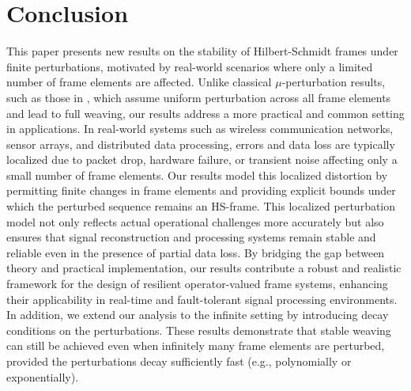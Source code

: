 \documentclass[reqno]{amsart}
\theoremstyle{plain}
\theoremstyle{remark}
\numberwithin{equation}{section}
\begin{document}
\section{Conclusion}

This paper presents new results on the stability of Hilbert-Schmidt frames under finite perturbations, motivated by real-world scenarios where only a limited number of frame elements are affected. Unlike classical $\mu$-perturbation results, such as those in \cite{CGK}, which assume uniform perturbation across all frame elements and lead to full weaving, our results address a more practical and common setting in applications. In real-world systems such as wireless communication networks, sensor arrays, and distributed data processing, errors and data loss are typically localized due to packet drop, hardware failure, or transient noise affecting only a small number of frame elements. Our results model this localized distortion by permitting finite changes in frame elements and providing explicit bounds under which the perturbed sequence remains an HS-frame. This localized perturbation model not only reflects actual operational challenges more accurately but also ensures that signal reconstruction and processing systems remain stable and reliable even in the presence of partial data loss.
By bridging the gap between theory and practical implementation, our results contribute a robust and realistic framework for the design of resilient operator-valued frame systems, enhancing their applicability in real-time and fault-tolerant signal processing environments. In addition, we extend our analysis to the infinite setting by introducing decay conditions on the perturbations. These results demonstrate that stable weaving can still be achieved even when infinitely many frame elements are perturbed, provided the perturbations decay sufficiently fast (e.g., polynomially or exponentially).
\end{document}
